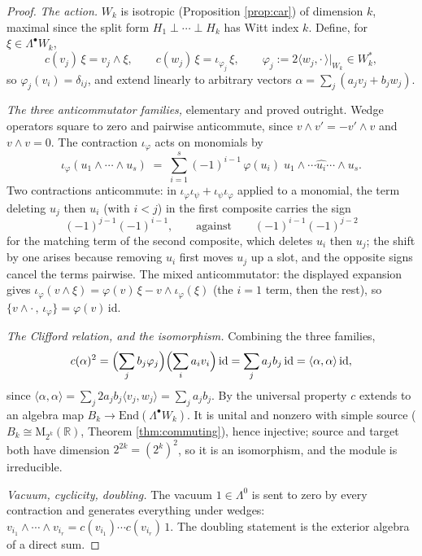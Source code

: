 \documentclass[11pt]{article}
\theoremstyle{definition}
\newcommand{\R}{\mathbb{R}}
\newcommand{\Mat}{\mathrm{M}}
\newcommand{\End}{\mathrm{End}}
\begin{document}
\begin{proof}
\emph{The action.} $W_k$ is isotropic (Proposition \ref{prop:car}) of dimension $k$, maximal since the split form $H_1 \perp \cdots \perp H_k$ has Witt index $k$. Define, for $\xi \in \Lambda^\bullet W_k$,
\[
c(v_j)\,\xi = v_j \wedge \xi, \qquad c(w_j)\,\xi = \iota_{\varphi_j}\,\xi, \qquad \varphi_j := 2\langle w_j, \cdot\,\rangle|_{W_k} \in W_k^* ,
\]
so $\varphi_j(v_i) = \delta_{ij}$, and extend linearly to arbitrary vectors $\alpha = \sum_j (a_j v_j + b_j w_j)$.

\emph{The three anticommutator families,} elementary and proved outright. Wedge operators square to zero and pairwise anticommute, since $v \wedge v' = -v' \wedge v$ and $v \wedge v = 0$. The contraction $\iota_\varphi$ acts on monomials by
\[
\iota_\varphi(u_1 \wedge \cdots \wedge u_s) \;=\; \sum_{i=1}^{s} (-1)^{i-1}\, \varphi(u_i)\; u_1 \wedge \cdots \widehat{u_i} \cdots \wedge u_s .
\]
Two contractions anticommute: in $\iota_\varphi \iota_\psi + \iota_\psi \iota_\varphi$ applied to a monomial, the term deleting $u_j$ then $u_i$ (with $i < j$) in the first composite carries the sign
\[
(-1)^{j-1}(-1)^{i-1},
\qquad \text{against} \qquad
(-1)^{i-1}(-1)^{j-2}
\]
for the matching term of the second composite, which deletes $u_i$ then $u_j$; the shift by one arises because removing $u_i$ first moves $u_j$ up a slot, and the opposite signs cancel the terms pairwise. The mixed anticommutator: the displayed expansion gives $\iota_\varphi(v \wedge \xi) = \varphi(v)\,\xi - v \wedge \iota_\varphi(\xi)$ (the $i = 1$ term, then the rest), so $\{v \wedge \cdot\,,\, \iota_\varphi\} = \varphi(v)\,\mathrm{id}$.

\emph{The Clifford relation, and the isomorphism.} Combining the three families,
\[
c(\alpha)^2 = \Bigl(\sum_j b_j \varphi_j\Bigr)\Bigl(\sum_i a_i v_i\Bigr)\,\mathrm{id} = \sum_j a_j b_j\,\mathrm{id} = \langle \alpha, \alpha\rangle\,\mathrm{id},
\]
since $\langle\alpha,\alpha\rangle = \sum_j 2 a_j b_j \langle v_j, w_j\rangle = \sum_j a_j b_j$. By the universal property $c$ extends to an algebra map $B_k \to \End(\Lambda^\bullet W_k)$. It is unital and nonzero with simple source ($B_k \cong \Mat_{2^k}(\R)$, Theorem \ref{thm:commuting}), hence injective; source and target both have dimension $2^{2k} = (2^k)^2$, so it is an isomorphism, and the module is irreducible.

\emph{Vacuum, cyclicity, doubling.} The vacuum $1 \in \Lambda^0$ is sent to zero by every contraction and generates everything under wedges: $v_{i_1} \wedge \cdots \wedge v_{i_r} = c(v_{i_1}) \cdots c(v_{i_r})\,1$. The doubling statement is the exterior algebra of a direct sum.
\end{proof}
\end{document}
